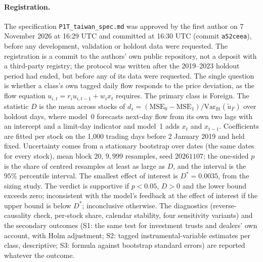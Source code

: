 \documentclass[12pt]{article}
\theoremstyle{definition}
\theoremstyle{remark}
\begin{document}
\paragraph{Registration.} The specification \nolinkurl{P1T_taiwan_spec.md} was approved by the first author on 7 November 2026 at 16:29 UTC and committed at 16:30 UTC (commit \texttt{a52ceea}), before any development, validation or holdout data were requested. The registration is a commit to the authors' own public repository, not a deposit with a third-party registry; the protocol was written after the 2019--2023 holdout period had ended, but before any of its data were requested. The single question is whether a class's own tagged daily flow responds to the price deviation, as the flow equation $u_{i,t} = r_i u_{i,t-1} + w_i x_t$ requires. The primary class is Foreign. The statistic $D$ is the mean across stocks of $d_s = (\mathrm{MSE}_0 - \mathrm{MSE}_1)/\mathrm{Var}_{\mathrm{fit}}(\tilde u_F)$ over holdout days, where model~0 forecasts next-day flow from its own two lags with an intercept and a limit-day indicator and model~1 adds $x_t$ and $x_{t-1}$. Coefficients are fitted per stock on the 1,000 trading days before 2 January 2019 and held fixed. Uncertainty comes from a stationary bootstrap over dates (the same dates for every stock), mean block 20, $9{,}999$ resamples, seed $20261107$; the one-sided $p$ is the share of centred resamples at least as large as $D$, and the interval is the $95\%$ percentile interval. The smallest effect of interest is $D^* = 0.0035$, from the sizing study. The verdict is supportive if $p < 0.05$, $D > 0$ and the lower bound exceeds zero; inconsistent with the model's feedback at the effect of interest if the upper bound is below $D^*$; inconclusive otherwise. The diagnostics (reverse-causality check, per-stock share, calendar stability, four sensitivity variants) and the secondary outcomes (S1: the same test for investment trusts and dealers' own account, with Holm adjustment; S2: tagged instrumental-variable estimates per class, descriptive; S3: formula against bootstrap standard errors) are reported whatever the outcome.
\end{document}
